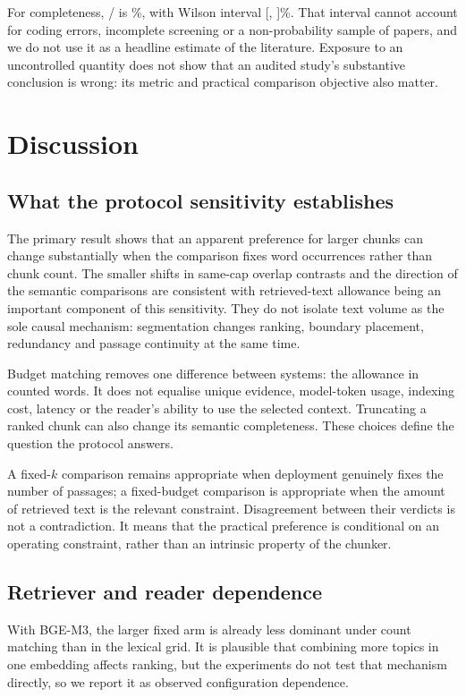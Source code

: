 \documentclass[11pt]{article}
\begin{document}
For completeness, \AuditExposed/\AuditN{} is \AuditExposedPct\%, with Wilson interval [\AuditExposedLo,
\AuditExposedHi]\%. That interval cannot account for coding errors, incomplete screening or a non-probability sample
of papers, and we do not use it as a headline estimate of the literature. Exposure to an uncontrolled quantity does not
show that an audited study's substantive conclusion is wrong: its metric and practical comparison objective also
matter.

\section{Discussion}\label{sec:discussion}
\subsection{What the protocol sensitivity establishes}
The primary result shows that an apparent preference for larger chunks can change substantially when the comparison
fixes word occurrences rather than chunk count. The smaller shifts in same-cap overlap contrasts and the direction of
the semantic comparisons are consistent with retrieved-text allowance being an important component of this
sensitivity. They do not isolate text volume as the sole causal mechanism: segmentation changes ranking, boundary
placement, redundancy and passage continuity at the same time.

Budget matching removes one difference between systems: the allowance in counted words. It does not equalise unique
evidence, model-token usage, indexing cost, latency or the reader's ability to use the selected context. Truncating a
ranked chunk can also change its semantic completeness. These choices define the question the protocol answers.

A fixed-$k$ comparison remains appropriate when deployment genuinely fixes the number of passages; a fixed-budget
comparison is appropriate when the amount of retrieved text is the relevant constraint. Disagreement between their
verdicts is not a contradiction. It means that the practical preference is conditional on an operating constraint,
rather than an intrinsic property of the chunker.

\subsection{Retriever and reader dependence}
With BGE-M3, the larger fixed arm is already less dominant under count matching than in the lexical grid. It is
plausible that combining more topics in one embedding affects ranking, but the experiments do not test that mechanism
directly, so we report it as observed configuration dependence.
\end{document}
